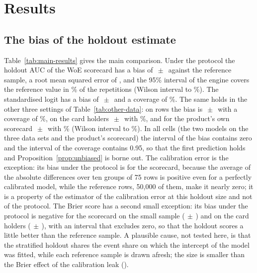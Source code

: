 \section{Results}
\label{sec:results}

\subsection{The bias of the holdout estimate}

Table~\ref{tab:main-results} gives the main comparison. Under the protocol the holdout AUC of the WoE scorecard has a bias of $\,\pm\,$ against the reference sample, a root mean squared error of , and the 95\% interval of the engine covers the reference value in \% of the  repetitions (Wilson interval  to \%). The standardised logit has a bias of $\,\pm\,$ and a coverage of \%. The same holds in the other three settings of Table~\ref{tab:other-data}: on  rows the bias is $\,\pm\,$ with a coverage of \%, on the card holders $\,\pm\,$ with \%, and for the product's own scorecard $\,\pm\,$ with \% (Wilson interval  to \%). In all  cells (the two models on the three data sets and the product's scorecard) the interval of the bias contains zero and the interval of the coverage contains 0.95, so that the first prediction holds and Proposition~\ref{prop:unbiased} is borne out. The calibration error is the exception: its bias under the protocol is  for the scorecard, because the average of the absolute differences over ten groups of 75 rows is positive even for a perfectly calibrated model, while the reference rows, 50,000 of them, make it nearly zero; it is a property of the estimator of the calibration error at this holdout size and not of the protocol. The Brier score has a second small exception: its bias under the protocol is negative for the scorecard on the small sample ($\,\pm\,$) and on the card holders ($\,\pm\,$), with an interval that excludes zero, so that the holdout scores a little better than the reference sample. A plausible cause, not tested here, is that the stratified holdout shares the event share on which the intercept of the model was fitted, while each reference sample is drawn afresh; the size is smaller than the Brier effect of the calibration leak ().

